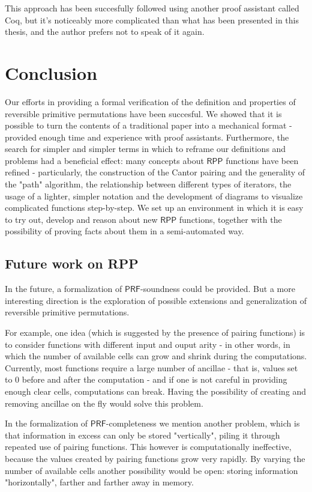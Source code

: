 \documentclass{book}
\theoremstyle{definition}
\theoremstyle{remark}
\theoremstyle{plain}
\newcommand{\RPP}{\mathsf{RPP}}
\newcommand{\PRF}{\mathsf{PRF}}
\begin{document}
This approach has been succesfully followed using another proof assistant called Coq,
but it's noticeably more complicated than what has been presented in this thesis,
and the author prefers not to speak of it again.

\chapter{Conclusion}

Our efforts in providing a formal verification of the definition and properties of reversible primitive permutations have been succesful.
We showed that it is possible to turn the contents of a traditional paper into a mechanical format -
provided enough time and experience with proof assistants.
Furthermore, the search for simpler and simpler terms in which to reframe our definitions and problems
had a beneficial effect: many concepts about $\RPP$ functions have been refined -
particularly, the construction of the Cantor pairing and the generality of the "path" algorithm,
the relationship between different types of iterators,
the usage of a lighter, simpler notation and the development of diagrams to visualize complicated functions step-by-step.
We set up an environment in which it is easy to try out, develop and reason about new $\RPP$ functions,
together with the possibility of proving facts about them in a semi-automated way.

\section{Future work on RPP}

In the future, a formalization of $\PRF$-soundness could be provided.
But a more interesting direction is the exploration of possible extensions and generalization of reversible primitive permutations.

For example, one idea (which is suggested by the presence of pairing functions) is to consider functions with
different input and ouput arity - in other words, in which the number of available cells can grow and shrink during the computations.
Currently, most functions require a large number of ancillae - that is, values set to $0$ before and after the computation -
and if one is not careful in providing enough clear cells, computations can break.
Having the possibility of creating and removing ancillae on the fly would solve this problem.

In the formalization of $\PRF$-completeness we mention another problem,
which is that information in excess can only be stored "vertically", piling it through repeated use of pairing functions.
This however is computationally ineffective, because the values created by pairing functions grow very rapidly.
By varying the number of available cells another possibility would be open: storing information "horizontally",
farther and farther away in memory.
\end{document}
